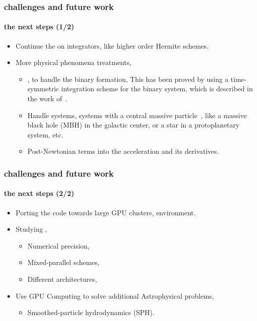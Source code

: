 \begin{frame}
    \frametitle{challenges and future work}
    \framesubtitle{the next steps (1/2)}

    \begin{itemize}
        \item Continue the  on {\nbody} integrators, like
                higher order Hermite schemes.
        \item More physical phenomena treatments,
        \begin{itemize}
            \item {}, to handle the binary formation,
                This has been proved by using a time-symmetric integration scheme
                for the binary system, which is described in the work of~\cite{myriad}.

            \item Handle  systems,
                    {\nbody} systems with a central massive particle~\cite{ulf},
                    like a massive black hole (MBH) in the galactic center,
                    or a star in a protoplanetary system, etc.

            \item Post-Newtonian terms into the acceleration and its derivatives.
        \end{itemize}
    \end{itemize}
\end{frame}

\begin{frame}
    \frametitle{challenges and future work}
    \framesubtitle{the next steps (2/2)}

    \begin{itemize}
        \item Porting the code towards large GPU clusters,  environment.
        \item Studying ,
        \begin{itemize}
            \item Numerical precision,
            \item Mixed-parallel schemes,
            \item Different architectures,
        \end{itemize}
        \item Use GPU Computing to solve additional Astrophysical problems,
        \begin{itemize}
            \item Smoothed-particle hydrodynamics (SPH).
        \end{itemize}

    \end{itemize}
\end{frame}


